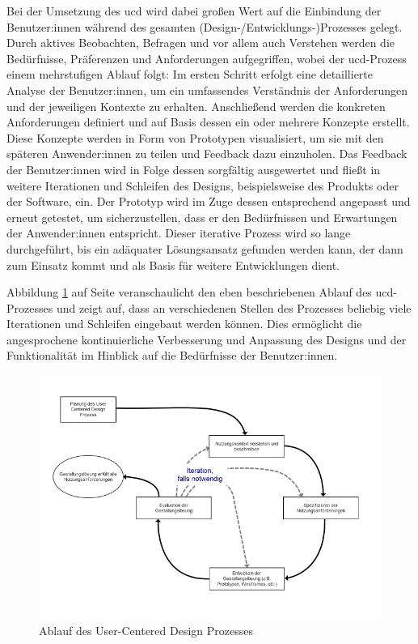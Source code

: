 \documentclass[a4paper,12pt,twoside]{scrreprt}
\begin{document}
Bei der Umsetzung des \ac{ucd} wird dabei großen Wert auf die Einbindung der Benutzer:innen während des gesamten (Design-/Entwicklungs-)Prozesses gelegt. Durch aktives Beobachten, Befragen und vor allem auch Verstehen werden die Bedürfnisse, Präferenzen und Anforderungen aufgegriffen, wobei der \ac{ucd}-Prozess einem  mehrstufigen Ablauf folgt: Im ersten Schritt erfolgt eine detaillierte Analyse der Benutzer:innen, um ein umfassendes Verständnis der Anforderungen und der jeweiligen Kontexte zu erhalten. Anschließend werden die konkreten Anforderungen definiert und auf Basis dessen ein oder mehrere Konzepte erstellt. Diese Konzepte werden in Form von Prototypen visualisiert, um sie mit den späteren Anwender:innen zu teilen und Feedback dazu einzuholen. Das Feedback der Benutzer:innen wird in Folge dessen sorgfältig ausgewertet und fließt in weitere Iterationen und Schleifen des Designs, beispielsweise des Produkts oder der Software, ein. Der Prototyp wird im Zuge dessen entsprechend angepasst und erneut getestet, um sicherzustellen, dass er den Bedürfnissen und Erwartungen der Anwender:innen entspricht. Dieser iterative Prozess wird so lange durchgeführt, bis ein adäquater Lösungsansatz gefunden werden kann, der dann zum Einsatz kommt und als Basis für weitere Entwicklungen dient. \cite{frieling_user_2019, ionos_se_user-centered_2022}

\medskip

Abbildung \ref{fig:ucd-prozess-ablauf} auf Seite \pageref{fig:ucd-prozess-ablauf} veranschaulicht den eben beschriebenen Ablauf des \ac{ucd}-Prozesses und zeigt auf, dass an verschiedenen Stellen des Prozesses beliebig viele Iterationen und Schleifen eingebaut werden können. Dies ermöglicht die angesprochene kontinuierliche Verbesserung und Anpassung des Designs und der Funktionalität im Hinblick auf die Bedürfnisse der Benutzer:innen.

\begin{figure}[ht!]
    \centering
    \includegraphics[width=.85\linewidth]{thesis/images/Frieling_UCD-Prozess.pdf}
    \caption[Ablauf des User-Centered Design Prozesses]{Ablauf des User-Centered Design Prozesses \cite{frieling_user_2019}}
    \label{fig:ucd-prozess-ablauf}
\end{figure}
\end{document}
